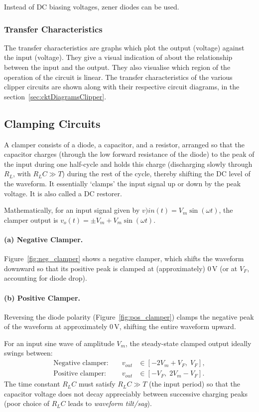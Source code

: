 Instead of DC biasing voltages, zener diodes can be used.
\subsubsection{Transfer Characteristics}
The transfer characteristics are graphs which plot the output (voltage) against the input (voltage). They give a visual indication of about the relationship between the input and the output. They also visualise which region of the operation of the circuit is linear. The transfer characteristics of the various clipper circuits are shown along with their respective circuit diagrams, in the section~\ref{sec:cktDiagramsClipper}. 

\subsection{Clamping Circuits}

A clamper consists of a diode, a capacitor, and a resistor, arranged so that the capacitor charges (through the low forward resistance of the diode) to the peak of the input during one half-cycle and holds this charge (discharging slowly through $R_L$, with $R_LC \gg T$) during the rest of the cycle, thereby shifting the DC level of the waveform. It essentially `clamps' the input signal up or down by the peak voltage. It is also called a DC restorer.

Mathematically, for an input signal given by $v){in}(t) = V_m\sin(\omega t)$, the clamper output is $v_o(t)= \pm V_m + V_m\sin(\omega t)$.

\paragraph{(a) Negative Clamper.}
Figure~\ref{fig:neg_clamper} shows a negative clamper, which shifts the waveform downward so that its positive peak is clamped at (approximately) $0\,\text{V}$ (or at $V_F$, accounting for diode drop).


\paragraph{(b) Positive Clamper.}
Reversing the diode polarity (Figure~\ref{fig:pos_clamper}) clamps the negative peak of the waveform at approximately $0\,\text{V}$, shifting the entire waveform upward.


For an input sine wave of amplitude $V_m$, the steady-state clamped output ideally swings between:
\begin{align}
	\text{Negative clamper: } && v_{out} &\in [-2V_m + V_F,\; V_F], \label{eq:neg_clamp}\\
	\text{Positive clamper: } && v_{out} &\in [-V_F,\; 2V_m - V_F]. \label{eq:pos_clamp}
\end{align}
The time constant $R_L C$ must satisfy $R_L C \gg T$ (the input period) so that the capacitor voltage does not decay appreciably between successive charging peaks (poor choice of $R_L C$ leads to \emph{waveform tilt/sag}).

